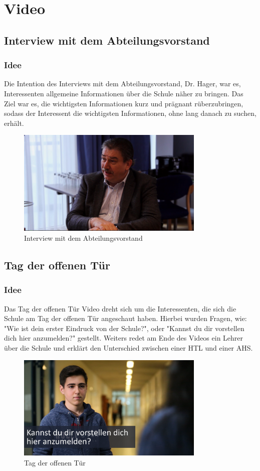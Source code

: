 \chapter{Video}
\renewcommand{\kapitelautor}{Autor: Kerstin Schön}
\section{Interview mit dem Abteilungsvorstand}
\subsection{Idee}
Die Intention des Interviews mit dem Abteilungsvorstand, Dr. Hager, war es, Interessenten allgemeine Informationen über die Schule näher zu bringen. Das Ziel war es, die wichtigsten Informationen kurz und prägnant rüberzubringen, sodass der Interessent die wichtigsten Informationen, ohne lang danach zu suchen, erhält.
\begin{figure}[H]
	\centering	
	\includegraphics[width=0.8\textwidth]{abb23} 
	\caption{Interview mit dem Abteilungsvorstand}
\end{figure}
\section{Tag der offenen Tür}
\subsection{Idee}
Das Tag der offenen Tür Video dreht sich um die Interessenten, die sich die Schule am Tag der offenen Tür angeschaut haben. Hierbei wurden Fragen, wie: "Wie ist dein erster Eindruck von der Schule?", oder "Kannst du dir vorstellen dich hier anzumelden?" gestellt. Weiters redet am Ende des Videos ein Lehrer über die Schule und erklärt den Unterschied zwischen einer HTL und einer AHS.
\begin{figure}[H]
	\centering	
	\includegraphics[width=0.8\textwidth]{abb24} 
	\caption{Tag der offenen Tür}
\end{figure}
